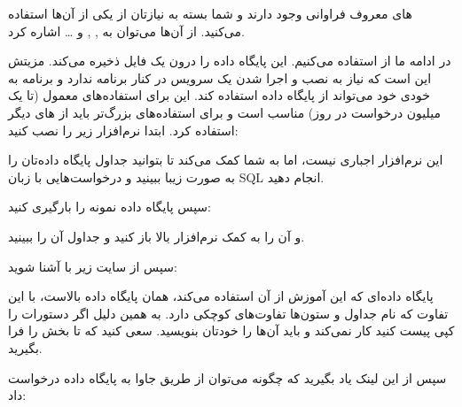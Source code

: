 \documentclass[]{article}
\begin{document}
 های معروف فراوانی وجود دارند و شما بسته به نیازتان از یکی از آن‌ها استفاده می‌کنید. از آن‌ها می‌توان به , ,  و … اشاره کرد.


در ادامه ما از  استفاده می‌کنیم. این  پایگاه داده را درون یک فایل ذخیره می‌کند. مزیتش این است که نیاز به نصب و اجرا شدن یک سرویس در کنار برنامه ندارد و برنامه به خودی خود می‌تواند از پایگاه داده استفاده کند. این  برای استفاده‌های معمول (تا یک میلیون درخواست در روز) مناسب است و برای استفاده‌های بزرگ‌تر باید از  های دیگر استفاده کرد.
\newpage
ابتدا نرم‌افزار زیر را نصب کنید:

\begin{flushleft}
\href{https://sqlitebrowser.org/dl/}{\textcolor{blue}{\underline{}}}	 	 	 	

\end{flushleft}


این نرم‌افزار اجباری نیست، اما به شما کمک می‌کند تا بتوانید جداول پایگاه داده‌تان را به صورت زیبا ببینید و درخواست‌هایی با زبان SQL انجام دهید.

سپس پایگاه داده نمونه  را بارگیری کنید:

\begin{flushleft}
\href{https://github.com/jpwhite3/northwind-SQLite3/blob/master/Northwind_small.sqlite}{\textcolor{blue}{\underline{}}}

\end{flushleft}

و آن را به کمک نرم‌افزار بالا باز کنید و جداول آن را ببینید.

سپس از سایت زیر با  آشنا شوید:
\begin{flushleft}
\href{https://www.w3schools.com/sql/sql_select.asp}{\textcolor{blue}{\underline{}}}

\end{flushleft}

پایگاه داده‌ای که این آموزش از آن استفاده می‌کند، همان پایگاه داده بالاست، با این تفاوت که نام جداول و ستون‌ها تفاوت‌های کوچکی دارد. به همین دلیل اگر دستورات را کپی پیست کنید کار نمی‌کند و باید آن‌ها را خودتان بنویسید. سعی کنید که تا بخش  را فرا بگیرید.

سپس از این لینک یاد بگیرید که چگونه می‌توان از طریق جاوا به پایگاه داده درخواست داد:

\begin{flushleft}
\href{https://www.tutorialspoint.com/sqlite/sqlite_java.htm}{\textcolor{blue}{\underline{}}}

\end{flushleft}
\end{document}
